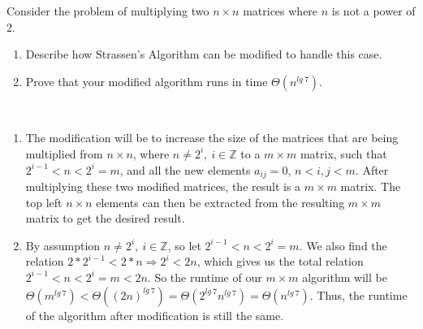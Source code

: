 \documentclass{assignment}
\begin{document}
\begin{problemlist}
\clearpage
\pbitem
\begin{problem}
Consider the problem of multiplying two $n\times n$ matrices where $n$ is not a power of 2.
\begin{enumerate}
\item Describe how Strassen's Algorithm can be modified to handle this case.
\item Prove that your modified algorithm runs in time $\Theta(n^{lg~7})$.
\end{enumerate}
\end{problem}
\begin{answer}
\\
\begin{enumerate}
\item
The modification will be to increase the size of the matrices that are being multiplied from $n\times n$, where $n \neq 2^i,~i\in \mathbb{Z}$ to a $m\times m$ matrix, such that $2^{i-1}< n < 2^i = m$, and all the new elements $a_{ij}=0$, $n < i,j < m$. After multiplying these two modified matrices, the result is a $m\times m$ matrix. The top left $n\times n$ elements can then be extracted from the resulting $m\times m$ matrix to get the desired result.\\
\item
By assumption $n \neq 2^i,~i\in \mathbb{Z}$, so let $2^{i-1}< n < 2^i = m$. We also find the relation $2*2^{i-1}< 2*n \Rightarrow 2^i< 2n$, which gives us the total relation $2^{i-1}< n < 2^i = m < 2n$. So the runtime of our $m\times m$ algorithm will be $\Theta (m^{lg~7}) < \Theta ((2n)^{lg~7}) = \Theta (2^{lg~7}n^{lg~7}) = \Theta (n^{lg~7})$. Thus, the runtime of the algorithm after modification is still the same.\\
\end{enumerate}
\end{answer}


\end{problemlist}
\end{document}
